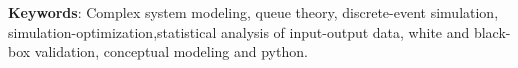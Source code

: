 \documentclass{wscpaperproc}
\theoremstyle{wsc}
\begin{document}
\noindent \textbf{Keywords}: Complex system modeling, queue theory,
discrete-event simulation, simulation-optimization,statistical analysis of
input-output data, white and black-box validation, conceptual modeling and
python.















\end{document}
